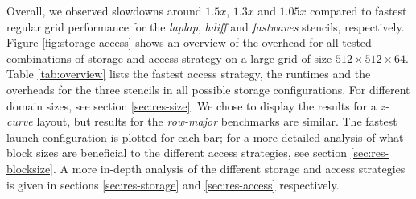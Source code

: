 Overall, we observed slowdowns around $1.5x$, $1.3x$ and $1.05x$ compared to fastest regular grid performance for the \emph{laplap}, \emph{hdiff} and \emph{fastwaves} stencils, respectively. Figure \ref{fig:storage-access} shows an overview of the overhead for all tested combinations of storage and access strategy on a large grid of size $512\times 512\times 64$. Table \ref{tab:overview} lists the fastest access strategy, the runtimes and the overheads for the three stencils in all possible storage configurations. For different domain sizes, see section \ref{sec:res-size}. We chose to display the results for a \emph{z-curve} layout, but results for the \emph{row-major} benchmarks are similar. The fastest launch configuration is plotted for each bar; for a more detailed analysis of what block sizes are beneficial to the different access strategies, see section \ref{sec:res-blocksize}. A more in-depth analysis of the different storage and access strategies is given in sections \ref{sec:res-storage} and \ref{sec:res-access} respectively.